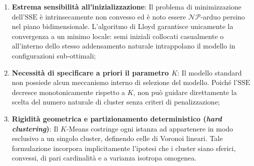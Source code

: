 \begin{enumerate}
    \item \textbf{Estrema sensibilità all'inizializzazione}: Il problema di minimizzazione dell'$\mathrm{SSE}$ è intrinsecamente non convesso ed è noto essere $\mathcal{NP}$-arduo persino nel piano bidimensionale. L'algoritmo di Lloyd garantisce unicamente la convergenza a un minimo locale: semi iniziali collocati casualmente o all'interno dello stesso addensamento naturale intrappolano il modello in configurazioni sub-ottimali;
    \item \textbf{Necessità di specificare a priori il parametro $K$}: Il modello standard non possiede alcun meccanismo interno di selezione del modello. Poiché l'$\mathrm{SSE}$ decresce monotonicamente rispetto a $K$, non può guidare direttamente la scelta del numero naturale di cluster senza criteri di penalizzazione;
    \item \textbf{Rigidità geometrica e partizionamento deterministico (\textit{hard clustering})}: Il $K$-Means costringe ogni istanza ad appartenere in modo esclusivo a un singolo cluster, definendo celle di Voronoi lineari. Tale formulazione incorpora implicitamente l'ipotesi che i cluster siano sferici, convessi, di pari cardinalità e a varianza isotropa omogenea.
\end{enumerate}

